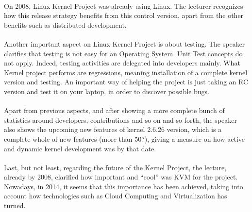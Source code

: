 \documentclass[11pt]{article}
\begin{document}
\\
On 2008, Linux Kernel Project was already using Linux. The lecturer recognizes how this release strategy benefits from this control version, apart from the other benefits such as distributed development.\\
\\
Another important aspect on Linux Kernel Project is about testing. The speaker clarifies that testing is not easy for an Operating System. Unit Test concepts do not apply. Indeed, testing activities are delegated into developers mainly. What Kernel project performs are regressions, meaning installation of a complete kernel version and testing. An important way of helping the project is just taking an RC version and test it on your laptop, in order to discover possible bugs.\\
\\
Apart from previous aspects, and after showing a more complete bunch of statistics around developers, contributions and so on and so forth, the speaker also shows the upcoming new features of kernel 2.6.26 version, which is a complete whole of new features (more than 50?), giving a measure on how active and dynamic kernel development was by that date.\\
\\
Last, but not least, regarding the future of the Kernel Project, the lecture, already by 2008, clarified how important and ``cool'' was KVM for the project. Nowadays, in 2014, it seems that this importance has been achieved, taking into account how technologies such as Cloud Computing and Virtualization has turned.

{}
\end{document}
